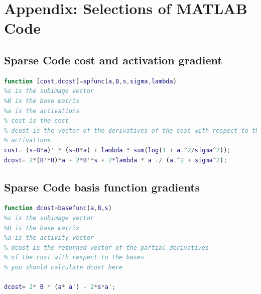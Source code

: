 \documentclass[journal]{IEEEtran}
\begin{document}
\section{Appendix: Selections of MATLAB Code}
\subsection{Sparse Code cost and activation gradient}
\begin{lstlisting}[language=MATLAB]
function [cost,dcost]=spfunc(a,B,s,sigma,lambda)
%s is the subimage vector
%B is the base matrix
%a is the activations
% cost is the cost
% dcost is the vector of the derivatives of the cost with respect to the
% activations
cost= (s-B*a)' * (s-B*a) + lambda * sum(log(1 + a.^2/sigma^2));
dcost= 2*(B'*B)*a - 2*B'*s + 2*lambda * a ./ (a.^2 + sigma^2);
\end{lstlisting}
\subsection{Sparse Code basis function gradients}
\begin{lstlisting}[language=MATLAB]
function dcost=basefunc(a,B,s)
%s is the subimage vector
%B is the base matrix
%a is the activity vector
% dcost is the returned vector of the partial derivatives 
% of the cost with respect to the bases
% you should calculate dcost here 

dcost= 2* B * (a* a') - 2*s*a';
\end{lstlisting}
\end{document}
